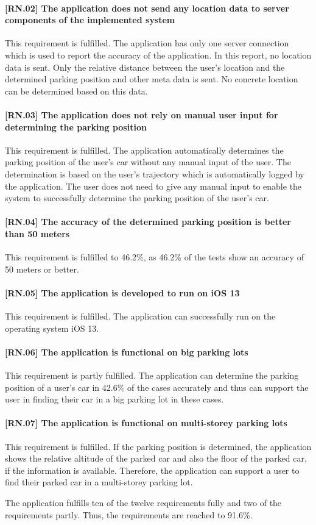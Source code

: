 \paragraph{[RN.02] The application does not send any location data to server components of the implemented system}
This requirement is fulfilled. The application has only one server connection which is used to report the accuracy of the application. In this report, no location data is sent. Only the relative distance between the user's location and the determined parking position and other meta data is sent. No concrete location can be determined based on this data.

\paragraph{[RN.03] The application does not rely on manual user input for determining the parking position}
This requirement is fulfilled. The application automatically determines the parking position of the user's car without any manual input of the user. The determination is based on the user's trajectory which is automatically logged by the application. The user does not need to give any manual input to enable the system to successfully determine the parking position of the user's car. 

\paragraph{[RN.04] The accuracy of the determined parking position is better than 50 meters}
This requirement is fulfilled to 46.2\%, as 46.2\% of the tests show an accuracy of 50 meters or better.

\paragraph{[RN.05] The application is developed to run on iOS 13}
This requirement is fulfilled. The application can successfully run on the operating system iOS 13.

\paragraph{[RN.06] The application is functional on big parking lots}
This requirement is partly fulfilled. The application can determine the parking position of a user's car in 42.6\% of the cases accurately and thus can support the user in finding their car in a big parking lot in these cases. 

\paragraph{[RN.07] The application is functional on multi-storey parking lots}
This requirement is fulfilled. If the parking position is determined, the application shows the relative altitude of the parked car and also the floor of the parked car, if the information is available. Therefore, the application can support a user to find their parked car in a multi-storey parking lot.

The application fulfills ten of the twelve requirements fully and two of the requirements partly. Thus, the requirements are reached to 91.6\%. 
